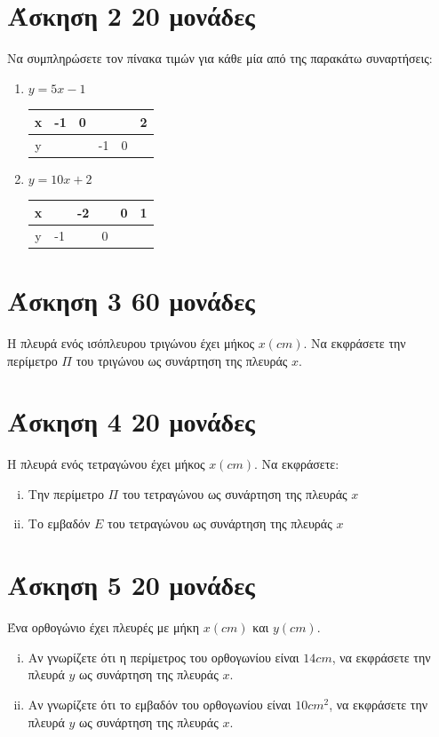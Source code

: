 \documentclass[a4paper,10pt]{report}
\begin{document}
\section*{Άσκηση 2  \hfill \small{20 μονάδες}}
Να συμπληρώσετε τον πίνακα τιμών για κάθε μία από της παρακάτω συναρτήσεις:
\begin{enumerate}[1)]
 \item $y=5x-1$
\begin{center}
 \begin{tabular}{|c|c|c|c|c|c|}\hline 
x        &  -1   &   0  &    &     & 2  \\
\hline 
y        &       &     &   -1& 0   &   \\
\hline 
\end{tabular}
\end{center}
 \item $y=10x+2$
\begin{center}
 \begin{tabular}{|c|c|c|c|c|c|}\hline 
x        &     &   -2  &      &   0  & 1  \\
\hline 
y        &  -1 &       & 0    &    &   \\
\hline 
\end{tabular}
\end{center}
\end{enumerate}




\section*{Άσκηση 3  \hfill \small{60 μονάδες}}
Η πλευρά ενός ισόπλευρου τριγώνου έχει μήκος $x (cm)$. Να εκφράσετε την περίμετρο $Π$ του τριγώνου ως 
συνάρτηση της πλευράς $x$.


\section*{Άσκηση 4  \hfill \small{20 μονάδες}}
Η πλευρά ενός τετραγώνου έχει μήκος $x (cm)$. Να εκφράσετε:
\begin{enumerate}[i)]
 \item Την περίμετρο $Π$ του τετραγώνου ως συνάρτηση της πλευράς $x$ 
 \item Το εμβαδόν $Ε$ του τετραγώνου ως συνάρτηση της πλευράς $x$ 
\end{enumerate}



\section*{Άσκηση 5  \hfill \small{20 μονάδες}}
Ένα ορθογώνιο έχει πλευρές με μήκη $x(cm)$ και $y(cm)$.
\begin{enumerate}[i)]
 \item Αν γνωρίζετε ότι η περίμετρος του ορθογωνίου είναι $14cm$, να εκφράσετε την πλευρά $y$ ως συνάρτηση της πλευράς $x$.
 \item Αν γνωρίζετε ότι το εμβαδόν του ορθογωνίου είναι $10cm^{2}$, 
να εκφράσετε την πλευρά $y$ ως συνάρτηση της πλευράς $x$.
\end{enumerate}
\end{document}
